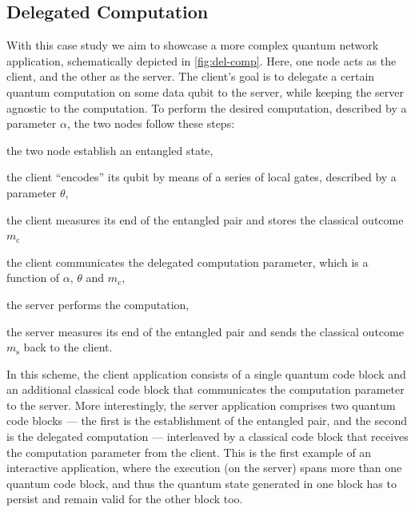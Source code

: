 \subsection{Delegated Computation}

With this case study we aim to showcase a more complex quantum network application, schematically
depicted in \cref{fig:del-comp}. Here, one node acts as the client, and the other as the server. The
client's goal is to delegate a certain quantum computation on some data qubit to the server, while
keeping the server agnostic to the computation. To perform the desired computation, described by a
parameter $\alpha$, the two nodes follow these steps:
%
\begin{inlinelist}
    \item the two node establish an entangled state,
    \item the client ``encodes'' its qubit by means of a series of local gates, described by a
          parameter $\theta$,
    \item the client measures its end of the entangled pair and stores the classical outcome
          $m_\text{c}$
    \item the client communicates the delegated computation parameter, which is a function of
          $\alpha$, $\theta$ and $m_\text{c}$,
    \item the server performs the computation,
    \item the server measures its end of the entangled pair and sends the classical outcome
          $m_\text{s}$ back to the client.
\end{inlinelist}
In this scheme, the client application consists of a single quantum code block and an additional
classical code block that communicates the computation parameter to the server. More interestingly,
the server application comprises two quantum code blocks --- the first is the establishment of the
entangled pair, and the second is the delegated computation --- interleaved by a classical code
block that receives the computation parameter from the client. This is the first example of an
interactive application, where the execution (on the server) spans more than one quantum code block,
and thus the quantum state generated in one block has to persist and remain valid for the other
block too.

